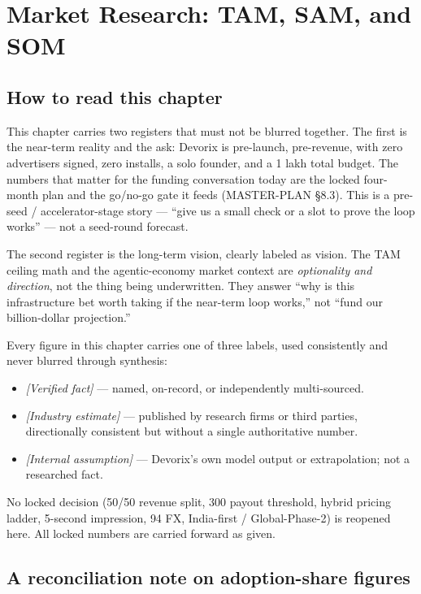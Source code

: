 \chapter{Market Research: TAM, SAM, and SOM}
\label{ch:market-research}

\section*{How to read this chapter}

This chapter carries two registers that must not be blurred together. The first is the near-term reality and the ask: Devorix is pre-launch, pre-revenue, with zero advertisers signed, zero installs, a solo founder, and a \textrm{\textrupee}1 lakh total budget. The numbers that matter for the funding conversation today are the locked four-month plan and the go/no-go gate it feeds (MASTER-PLAN \S 8.3). This is a pre-seed / accelerator-stage story --- ``give us a small check or a slot to prove the loop works'' --- not a seed-round forecast.

The second register is the long-term vision, clearly labeled as vision. The TAM ceiling math and the agentic-economy market context are \emph{optionality and direction}, not the thing being underwritten. They answer ``why is this infrastructure bet worth taking if the near-term loop works,'' not ``fund our billion-dollar projection.''

Every figure in this chapter carries one of three labels, used consistently and never blurred through synthesis:

\begin{itemize}
  \item \textit{[Verified fact]} --- named, on-record, or independently multi-sourced.
  \item \textit{[Industry estimate]} --- published by research firms or third parties, directionally consistent but without a single authoritative number.
  \item \textit{[Internal assumption]} --- Devorix's own model output or extrapolation; not a researched fact.
\end{itemize}

No locked decision (50/50 revenue split, \textrm{\textrupee}300 payout threshold, hybrid pricing ladder, 5-second impression, \textrm{\textrupee}94 FX, India-first / Global-Phase-2) is reopened here. All locked numbers are carried forward as given.

\section{A reconciliation note on adoption-share figures}
\label{sec:adoption-reconciliation}


